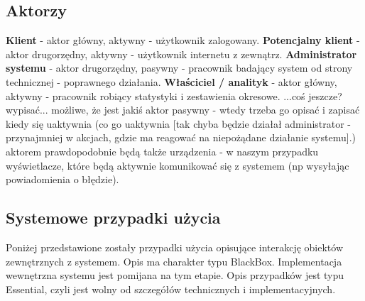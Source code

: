 \documentclass[10pt,a4paper,titlepage]{article} %
\begin{document}
		\subsection{Aktorzy}
		{\bf Klient} - aktor główny, aktywny - użytkownik zalogowany.\newline
		{\bf Potencjalny klient} - aktor drugorzędny, aktywny - użytkownik internetu z zewnątrz.\newline
		{\bf Administrator systemu} - aktor drugorzędny, pasywny - pracownik badający system od strony technicznej - poprawnego działania.\newline
		{\bf Właściciel / analityk} - aktor główny, aktywny - pracownik robiący statystyki i zestawienia okresowe.\newline
		...coś jeszcze? wypisać...\newline
		możliwe, że jest jakiś aktor pasywny - wtedy trzeba go opisać i zapisać kiedy się uaktywnia (co go uaktywnia [tak chyba będzie działał administrator - przynajmniej w akcjach, gdzie ma reagować na niepożądane działanie systemu].)\newline
		aktorem prawdopodobnie będą także urządzenia - w naszym przypadku wyświetlacze, które będą aktywnie komunikować się z systemem (np wysyłając powiadomienia o błędzie).\newline
		\subsection{Systemowe przypadki użycia}
		Poniżej przedstawione zostały przypadki użycia opisujące interakcję obiektów zewnętrznych z systemem.\newline
		Opis ma charakter typu BlackBox. Implementacja wewnętrzna systemu jest pomijana na tym etapie. Opis przypadków jest typu Essential, czyli jest wolny od szczegółów technicznych i implementacyjnych.\newline
\end{document}
